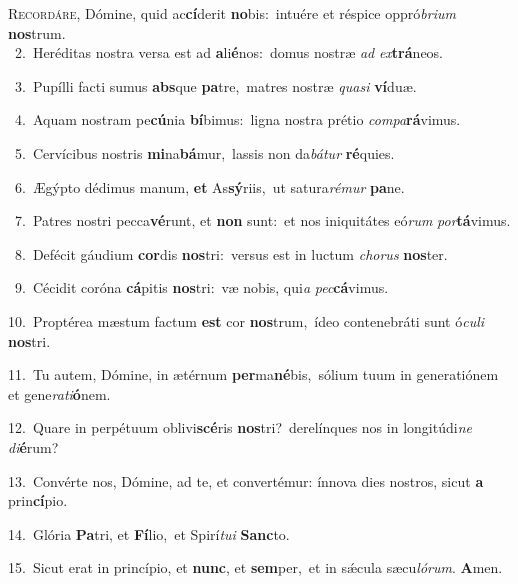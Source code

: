 \lettrine{\initial\textcolor{\initialcolor}{R}}{ecordáre,} Dómine, quid ac\-\textbf{cí}\-derit \textbf{no}\-bis:~\star intuére et réspice oppró\-\textit{bri}\-\textit{um} \textbf{nos}\-trum.\\
{\numbfont\textcolor{\numbcolor}{~2.}}~Heréditas nostra versa est ad \textbf{a}\-li\-\textbf{é}\-nos:~\star domus nostræ \textit{ad} \textit{ex}\-\textbf{trá}neos.\par
{\numbfont\textcolor{\numbcolor}{~3.}}~Pupílli facti sumus \textbf{abs}\-que \textbf{pa}\-tre,~\star matres nostræ \textit{qua}\-\textit{si} \textbf{ví}\-duæ.\par
{\numbfont\textcolor{\numbcolor}{~4.}}~Aquam nostram pe\-\textbf{cú}\-nia \textbf{bí}\-bimus:~\star ligna nostra prétio \textit{com}\-\textit{pa}\textbf{rá}vimus.\par
{\numbfont\textcolor{\numbcolor}{~5.}}~Cervícibus nostris \textbf{mi}\-na\-\textbf{bá}\-mur,~\star lassis non da\-\textit{bá}\-\textit{tur} \textbf{ré}\-quies.\par
{\numbfont\textcolor{\numbcolor}{~6.}}~Ægýpto dédimus manum, \textbf{et} As\-\textbf{sý}\-riis,~\star ut satura\-\textit{ré}\-\textit{mur} \textbf{pa}\-ne.\par
{\numbfont\textcolor{\numbcolor}{~7.}}~Patres nostri pecca\-\textbf{vé}\-runt, et \textbf{non} sunt:~\star et nos iniquitátes eó\textit{rum} \textit{por}\-\textbf{tá}vimus.\par
{\numbfont\textcolor{\numbcolor}{~8.}}~Defécit gáudium \textbf{cor}\-dis \textbf{nos}\-tri:~\star versus est in luctum \textit{cho}\-\textit{rus} \textbf{nos}\-ter.\par
{\numbfont\textcolor{\numbcolor}{~9.}}~Cécidit coróna \textbf{cá}\-pitis \textbf{nos}\-tri:~\star væ nobis, qui\textit{a} \textit{pec}\-\textbf{cá}vimus.\par
{\numbfont\textcolor{\numbcolor}{10.}}~Proptérea mæstum factum \textbf{est} cor \textbf{nos}\-trum,~\star ídeo contenebráti sunt ó\-\textit{cu}\-\textit{li} \textbf{nos}\-tri.\par
{\numbfont\textcolor{\numbcolor}{11.}}~Tu autem, Dómine, in ætérnum \textbf{per}\-ma\-\textbf{né}\-bis,~\star sólium tuum in generatiónem et gene\-\textit{ra}\-\textit{ti}\textbf{ó}nem.\par
{\numbfont\textcolor{\numbcolor}{12.}}~Quare in perpétuum oblivi\-\textbf{scé}\-ris \textbf{nos}\-tri?~\star derelínques nos in longitúdi\textit{ne} \textit{di}\-\textbf{é}rum?\par
{\numbfont\textcolor{\numbcolor}{13.}}~Convérte nos, Dómine, ad te, et convertémur: ínnova dies nostros, sicut \textbf{a} prin\-\textbf{cí}\-pio.\par
{\numbfont\textcolor{\numbcolor}{14.}}~Glória \textbf{Pa}\-tri, et \textbf{Fí}\-lio,~\star et Spirí\-\textit{tu}\-\textit{i} \textbf{Sanc}\-to.\par
{\numbfont\textcolor{\numbcolor}{15.}}~Sicut erat in princípio, et \textbf{nunc}\-, et \textbf{sem}\-per,~\star et in sǽcula sæcu\-\textit{ló}\-\textit{rum}. \textbf{A}\-men.\par
